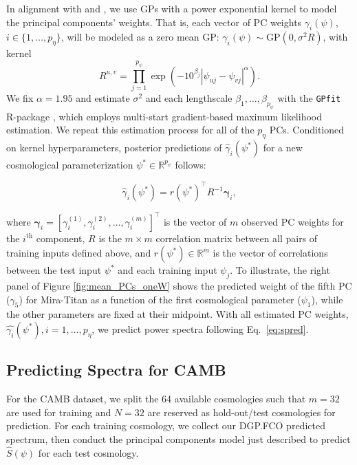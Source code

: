 \documentclass[11pt]{article}
\begin{document}
In alignment with \cite{higdon2010estcosmo} and \cite{moran2023mira}, we use 
GPs with a power exponential kernel to model the principal components' weights. 
That is, each vector of PC weights $\gamma_i(\psi)$, $i \in \{1,\ldots,p_\eta\}$, 
will be modeled as a zero mean GP: $\gamma_i(\psi) \sim \mathrm{GP}(0, \sigma^2R)$, with kernel
\begin{equation*}
    R^{u,v} = \prod_{j=1}^{p_\psi}\exp\left(-10^{\beta_j}|\psi_{uj}-\psi_{vj}|^\alpha\right).
\end{equation*}
We fix $\alpha=1.95$ and estimate $\sigma^2$ and each lengthscale $\beta_1,\ldots,\beta_{p_\psi}$ 
with the \texttt{GPfit} {\sf R}-package \citep{macdonald2015gpfit}, which employs multi-start 
gradient-based maximum likelihood estimation.  We repeat this estimation
process for all of the $p_\eta$ PCs.  Conditioned on kernel hyperparameters,
posterior predictions of $\hat{\gamma}_i(\psi^*)$ for a new cosmological parameterization 
$\psi^* \in \mathbb{R}^{p_\psi}$ follows:

\begin{equation*}
\hat{\gamma}_i(\psi^*) = r(\psi^*)^\top R^{-1} \boldsymbol{\gamma}_i,
\end{equation*}

\noindent
where $\boldsymbol{\gamma}_i = [\gamma_i^{(1)}, \gamma_i^{(2)}, \ldots, \gamma_i^{(m)}]^\top$ 
is the vector of $m$ observed PC weights for the $i^\textrm{th}$ component, 
$R$ is the $m \times m$ correlation matrix between 
all pairs of training inputs defined above, and $r(\psi^*) \in \mathbb{R}^m$ is 
the vector of correlations between the test input $\psi^*$ and each training input 
$\psi_j$. To illustrate, the right panel of Figure \ref{fig:mean_PCs_oneW} shows
the predicted weight of the fifth PC ($\gamma_5$) for Mira-Titan as a function 
of the first cosmological parameter ($\psi_1$), while the other parameters are fixed 
at their midpoint.  With all estimated PC weights, $\hat{\gamma_i}(\psi^*), i=1,\ldots,p_\eta$, 
we predict power spectra following Eq.~\ref{eq:spred}.  

\subsection{Predicting Spectra for CAMB}
\label{subsec:camb_pred}

For the CAMB dataset, we split the 64 available cosmologies such that $m=32$
are used for training and $N=32$ are reserved as hold-out/test cosmologies for prediction. 
For each training cosmology, we collect our DGP.FCO predicted spectrum, then conduct the principal
components model just described to predict $\hat{S}(\psi)$ for each test cosmology.  
\end{document}
